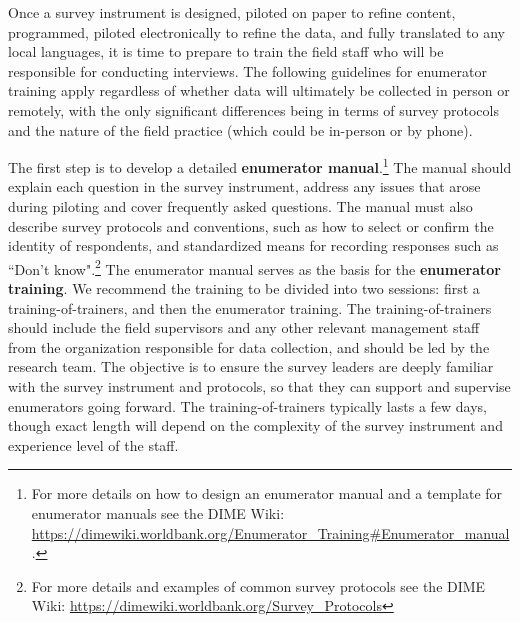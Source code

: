 \documentclass[
]{book}
\begin{document}
Once a survey instrument is designed, piloted on paper to refine content,
programmed, piloted electronically to refine the data,
and fully translated to any local languages,
it is time to prepare to train the field staff who will be
responsible for conducting interviews.
The following guidelines for enumerator training apply regardless of
whether data will ultimately be collected in person or remotely,
with the only significant differences being in terms of survey protocols and
the nature of the field practice (which could be in-person or by phone).

The first step is to develop a detailed \textbf{enumerator manual}.\footnote{For more details on how to design an enumerator manual
  and a template for enumerator manuals
  see the DIME Wiki:
  \url{https://dimewiki.worldbank.org/Enumerator_Training\#Enumerator_manual}.}
The manual should explain each question in the survey instrument,
address any issues that arose during piloting
and cover frequently asked questions.
The manual must also describe survey protocols and conventions,
such as how to select or confirm the identity of respondents,
and standardized means for recording responses such as ``Don't know".\footnote{For more details and examples of common survey protocols
  see the DIME Wiki:
  \url{https://dimewiki.worldbank.org/Survey_Protocols}}
The enumerator manual serves as the basis for the \textbf{enumerator training}.
We recommend the training to be divided into two sessions:
first a training-of-trainers, and then the enumerator training.
The training-of-trainers should include the field supervisors
and any other relevant management staff from the organization responsible for data collection,
and should be led by the research team.
The objective is to ensure the survey leaders are
deeply familiar with the survey instrument and protocols,
so that they can support and supervise enumerators going forward.
The training-of-trainers typically lasts a few days,
though exact length will depend on the complexity of the
survey instrument and experience level of the staff.
\end{document}
